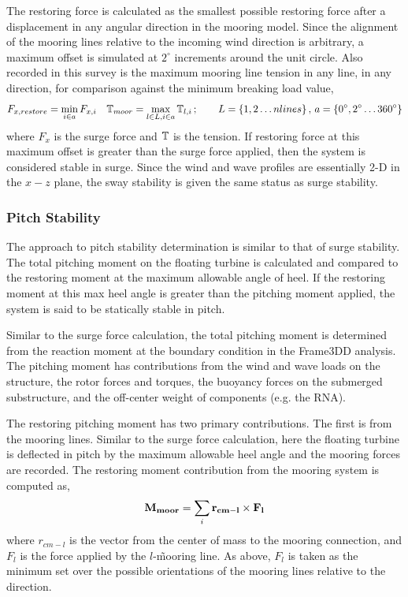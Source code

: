 The restoring force is calculated as the smallest possible restoring
force after a displacement in any angular direction in the mooring
model.  Since the alignment of the mooring lines relative to the
incoming wind direction is arbitrary, a maximum offset is simulated at
$2^{\circ}$ increments around the unit circle. Also recorded in this
survey is the maximum mooring line tension in any
line, in any direction, for comparison against the minimum breaking load
value,
\begin{equation}
  F_{x,restore} = \min_{i\in a} F_{x,i}\quad \mathbb{T}_{moor} = \max_{l\in L,i\in a} \mathbb{T}_{l,i}\,;
\qquad L=\left\{1,2\ldots nlines\right\}, \, a= \left\{0^{\circ}, 2^{\circ}\ldots 360^{\circ}\right\}
\end{equation}
where $F_x$ is the surge force and $\mathbb{T}$ is the tension.  If
restoring force at this maximum offset is greater than the surge force
applied, then the system is considered stable in surge.  Since the wind
and wave profiles are essentially 2-D in the $x-z$ plane, the sway
stability is given the same status as surge stability.


\subsubsection{Pitch Stability}
The approach to pitch stability determination is similar to that of
surge stability.  The total pitching moment on the floating turbine is
calculated and compared to the restoring moment at the maximum allowable
angle of heel.  If the restoring moment at this max heel angle is
greater than the pitching moment applied, the system is said to be
statically stable in pitch.

Similar to the surge force calculation, the total pitching moment is
determined from the reaction moment at the boundary condition
in the Frame3DD analysis.  The pitching moment has contributions from
the wind and wave loads on the structure, the rotor forces and torques,
the buoyancy forces on the submerged substructure, and the off-center
weight of components (e.g. the RNA).

The restoring pitching moment has two primary contributions.  The first
is from the mooring lines.  Similar to the surge force calculation, here
the floating turbine is deflected in pitch by the maximum allowable heel
angle and the mooring forces are recorded.  The restoring moment
contribution from the mooring system is computed as,
\begin{equation}
  \mathbf{M_{moor}} = \sum_i \mathbf{r_{cm-l}} \times \mathbf{F_l}
\end{equation}
where $r_{cm-l}$ is the vector from the center of mass to the mooring
connection, and $F_l$ is the force applied by the $l$-\th\~mooring
line.  As above, $F_l$ is taken as the minimum set over the possible
orientations of the mooring lines relative to the direction.

